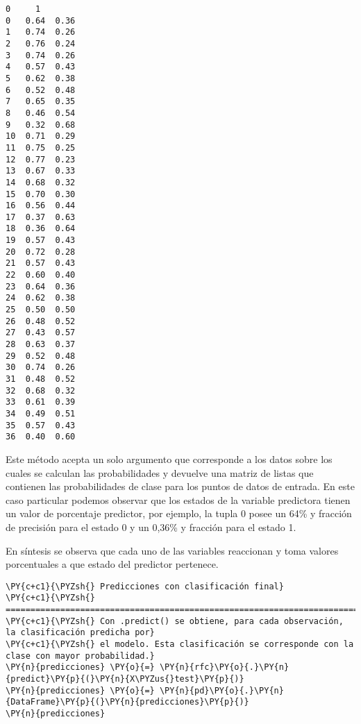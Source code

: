             \begin{tcolorbox}[breakable, size=fbox, boxrule=.5pt, pad at break*=1mm, opacityfill=0]
\begin{Verbatim}[commandchars=\\\{\}]
       0     1
0   0.64  0.36
1   0.74  0.26
2   0.76  0.24
3   0.74  0.26
4   0.57  0.43
5   0.62  0.38
6   0.52  0.48
7   0.65  0.35
8   0.46  0.54
9   0.32  0.68
10  0.71  0.29
11  0.75  0.25
12  0.77  0.23
13  0.67  0.33
14  0.68  0.32
15  0.70  0.30
16  0.56  0.44
17  0.37  0.63
18  0.36  0.64
19  0.57  0.43
20  0.72  0.28
21  0.57  0.43
22  0.60  0.40
23  0.64  0.36
24  0.62  0.38
25  0.50  0.50
26  0.48  0.52
27  0.43  0.57
28  0.63  0.37
29  0.52  0.48
30  0.74  0.26
31  0.48  0.52
32  0.68  0.32
33  0.61  0.39
34  0.49  0.51
35  0.57  0.43
36  0.40  0.60
\end{Verbatim}
\end{tcolorbox}
        
    Este método acepta un solo argumento que corresponde a los datos sobre
los cuales se calculan las probabilidades y devuelve una matriz de
listas que contienen las probabilidades de clase para los puntos de
datos de entrada. En este caso particular podemos observar que los
estados de la variable predictora tienen un valor de porcentaje
predictor, por ejemplo, la tupla 0 posee un 64\% y fracción de precisión
para el estado 0 y un 0,36\% y fracción para el estado 1.

En síntesis se observa que cada uno de las variables reaccionan y toma
valores porcentuales a que estado del predictor pertenece.

    \begin{tcolorbox}[breakable, size=fbox, boxrule=1pt, pad at break*=1mm,colback=cellbackground, colframe=cellborder]
\begin{Verbatim}[commandchars=\\\{\}]
\PY{c+c1}{\PYZsh{} Predicciones con clasificación final}
\PY{c+c1}{\PYZsh{} ==============================================================================}
\PY{c+c1}{\PYZsh{} Con .predict() se obtiene, para cada observación, la clasificación predicha por}
\PY{c+c1}{\PYZsh{} el modelo. Esta clasificación se corresponde con la clase con mayor probabilidad.}
\PY{n}{predicciones} \PY{o}{=} \PY{n}{rfc}\PY{o}{.}\PY{n}{predict}\PY{p}{(}\PY{n}{X\PYZus{}test}\PY{p}{)}
\PY{n}{predicciones} \PY{o}{=} \PY{n}{pd}\PY{o}{.}\PY{n}{DataFrame}\PY{p}{(}\PY{n}{predicciones}\PY{p}{)}
\PY{n}{predicciones}
\end{Verbatim}
\end{tcolorbox}

